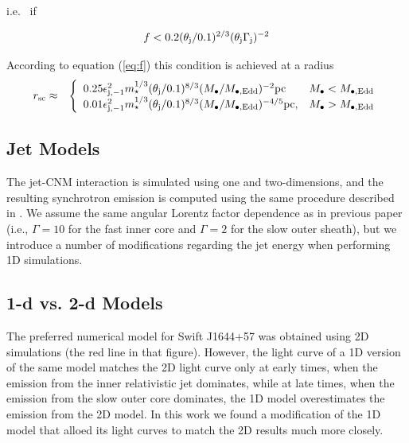 \documentclass[usenatbib,fleqn]{mnras}
\begin{document}
i.e.~ if

\begin{equation}
f < 0.2(\theta_{\rm j}/0.1)^{2/3}(\theta_{\rm j}\Gamma_{\rm j})^{-2}
\end{equation}

According to equation (\ref{eq:f}) this condition is achieved at a radius 
\begin{eqnarray}
r_{\rm sc}  &\approx & \left\{
\begin{array}{lr}
0.25\epsilon_{\rm j,-1}^{2}m_{\star}^{1/3}(\theta_{\rm j}/0.1)^{8/3}(M_{\bullet}/M_{\bullet, \rm Edd})^{-2}{\rm pc}
&  M_{\bullet} < M_{\bullet, \rm Edd} \\
0.01\epsilon_{\rm j,-1}^{2}m_{\star}^{1/3}(\theta_{\rm j}/0.1)^{8/3}(M_{\bullet}/M_{\bullet, \rm Edd})^{-4/5}{\rm pc}
,& M_{\bullet} > M_{\bullet, \rm Edd}\\
\end{array}
\right. 
\label{eq:rsc}
\end{eqnarray}


\subsection{Jet Models}
\label{sec:numerical}

The jet-CNM interaction is simulated using one and two-dimensions, and
the resulting synchrotron emission is computed using the same
procedure described in \citet{Mimica+2015}. We assume the same angular
Lorentz factor dependence as in previous paper (i.e., $\Gamma = 10$
for the fast inner core and $\Gamma = 2$ for the slow outer sheath),
but we introduce a number of modifications regarding the jet energy
when performing 1D simulations.

\subsection{1-d vs. 2-d Models}
\label{sec:2d}

The preferred numerical model for Swift J1644+57 \citep[Fig.10
in][]{Mimica+2015} was obtained using 2D simulations (the red line in
that figure). However, the light curve of a 1D version of the same
model \citep[black line in Fig. 10 in][see also section 4.2 of that
paper]{Mimica+2015} matches the 2D light curve only at early times,
when the emission from the inner relativistic jet dominates, while at
late times, when the emission from the slow outer core dominates, the
1D model overestimates the emission from the 2D model. In this work we
found a modification of the 1D model that alloed its light curves to
match the 2D results much more closely.
\end{document}
